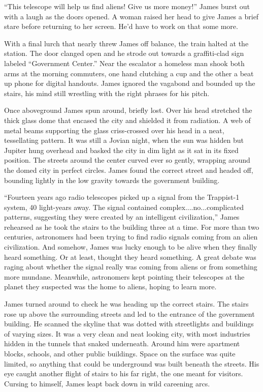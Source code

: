 \documentclass[openany, 12pt]{book} %
\begin{document}
``This telescope will help us find aliens! Give us more money!'' James burst out with a laugh as the doors opened. A woman raised her head to give James a brief stare before returning to her screen. He'd have to work on that some more.

With a final lurch that nearly threw James off balance, the train halted at the station. The door clanged open and he strode out towards a graffiti-clad sign labeled ``Government Center.'' Near the escalator a homeless man shook both arms at the morning commuters, one hand clutching a cup and the other a beat up phone for digital handouts. James ignored the vagabond and bounded up the stairs, his mind still wrestling with the right phrases for his pitch.

Once aboveground James spun around, briefly lost. Over his head stretched the thick glass dome that encased the city and shielded it from radiation. A web of metal beams supporting the glass criss-crossed over his head in a neat, tessellating pattern. It was still a Jovian night, when the sun was hidden but Jupiter hung overhead and basked the city in dim light as it sat in its fixed position. The streets around the center curved ever so gently, wrapping around the domed city in perfect circles. James found the correct street and headed off, bounding lightly in the low gravity towards the government building.

``Fourteen years ago radio telescopes picked up a signal from the Trappist-1 system, 40 light-years away. The signal contained complex....no...complicated patterns, suggesting they were created by an intelligent civilization,'' James rehearsed as he took the stairs to the building three at a time. For more than two centuries, astronomers had been trying to find radio signals coming from an alien civilization. And somehow, James was lucky enough to be alive when they finally heard something. Or at least, thought they heard something. A great debate was raging about whether the signal really was coming from aliens or from something more mundane. Meanwhile, astronomers kept pointing their telescopes at the planet they suspected was the home to aliens, hoping to learn more.

James turned around to check he was heading up the correct stairs. The stairs rose up above the surrounding streets and led to the entrance of the government building. He scanned the skyline that was dotted with streetlights and buildings of varying sizes. It was a very clean and neat looking city, with most industries hidden in the tunnels that snaked underneath. Around him were apartment blocks, schools, and other public buildings. Space on the surface was quite limited, so anything that could be underground was built beneath the streets. His eye caught another flight of stairs to his far right, the one meant for visitors. Cursing to himself, James leapt back down in wild careening arcs.
\end{document}
